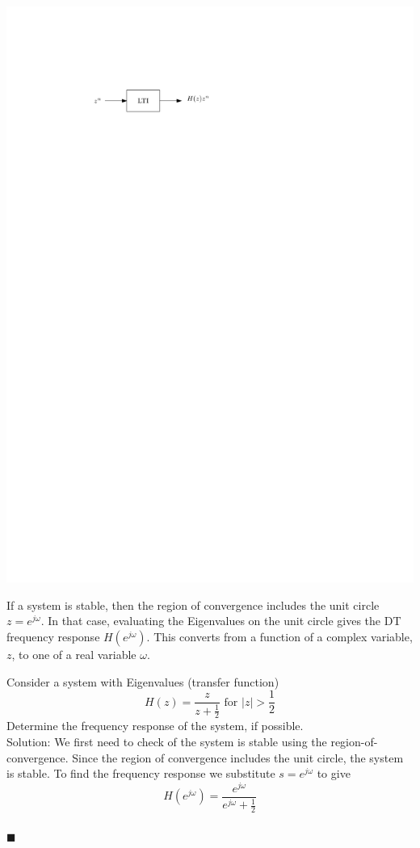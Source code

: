 \begin{center}
  \includegraphics[scale=1]{graphics/19-dt-tf.pdf}
\end{center}

If a system is stable, then the region of convergence includes the unit circle $z = e^{j\omega}$. In that case, evaluating the Eigenvalues on the unit circle gives the DT frequency response $H\left(e^{j\omega}\right)$. This converts from a function of a complex variable, $z$, to one of a real variable $\omega$.

\begin{example} Consider a system with Eigenvalues (transfer function)
  \[
  H(z) = \frac{z}{z+\tfrac{1}{2}}\mbox{ for } |z| > \frac{1}{2}
  \]
  Determine the frequency response of the system, if possible.\\

  Solution: We first need to check of the system is stable using the region-of-convergence. Since the region of convergence includes the unit circle, the system is stable. To find the frequency response we substitute $s = e^{j\omega}$ to give
  \[
  H\left(e^{j\omega}\right) = \frac{e^{j\omega}}{e^{j\omega} + \tfrac{1}{2}}
  \]
  \\$\blacksquare$
\end{example}


